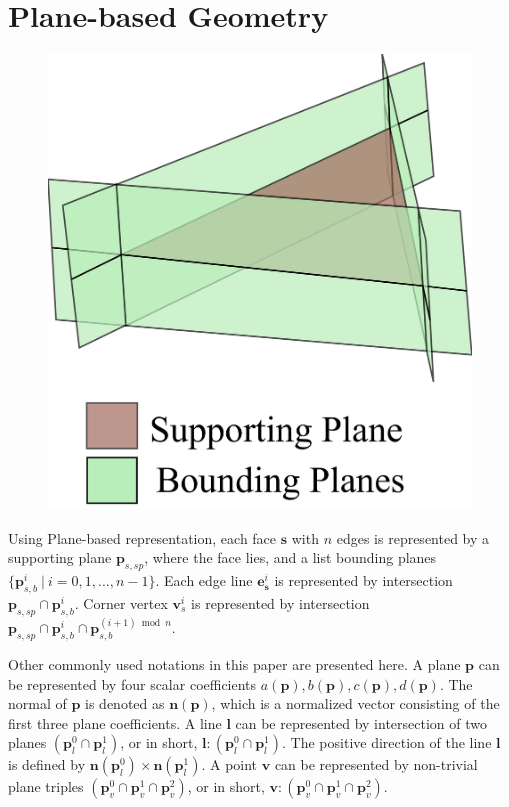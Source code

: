 \documentclass[10pt,journal,compsoc]{IEEEtran}
\begin{document}
\section{Plane-based Geometry}



\begin{figure}
\includegraphics[width=1.5 in]{p-reps}
\end{figure}

Using Plane-based representation, each face $\bm{s}$ with $n$ edges is represented by a supporting plane $\bm{p}_{s,sp}$, where the face lies, and a list bounding planes $\{\bm{p}_{s,b}^i \ \vert\  i = 0, 1,...,n-1\}$. Each edge line $\bm{e}_{\bm{s}}^i$ is represented by intersection $\bm{p}_{s,sp} \cap \bm{p}_{s,b}^i$. Corner vertex $\bm{v}_s^i$ is represented by intersection $\bm{p}_{s,sp} \cap \bm{p}_{s,b}^i \cap \bm{p}_{s,b}^{{(i+1)}\bmod{n}}$.


Other commonly used notations in this paper are presented here. A plane $\bm{p}$ can be represented by four scalar coefficients $a(\bm{p}), b(\bm{p}), c(\bm{p}), d(\bm{p})$. The normal of $\bm{p}$ is denoted as $\bm{n}(\bm{p})$, which is a normalized vector consisting of the first three plane coefficients. A line $\bm{l}$ can be represented by intersection of two planes $(\bm{p}_l^0 \cap \bm{p}_l^1)$, or in short, $\bm{l}\colon(\bm{p}_l^0 \cap \bm{p}_l^1)$. The positive direction of the line $\bm{l}$ is defined by $\bm{n}(\bm{p}_l^0) \times \bm{n}(\bm{p}_l^1)$. A point $\bm{v}$ can be represented by non-trivial plane triples $(\bm{p}_v^0 \cap \bm{p}_v^1 \cap \bm{p}_v^2)$, or in short, $\bm{v}\colon(\bm{p}_v^0 \cap \bm{p}_v^1 \cap \bm{p}_v^2)$.
\end{document}
